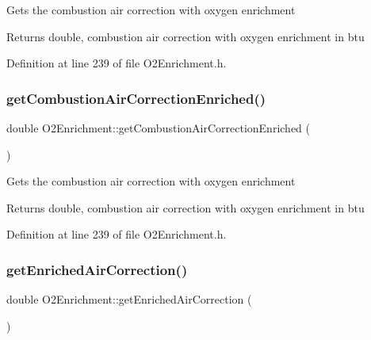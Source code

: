 Gets the combustion air correction with oxygen enrichment \begin{DoxyReturn}{Returns}
double, combustion air correction with oxygen enrichment in btu 
\end{DoxyReturn}


Definition at line 239 of file O2\+Enrichment.\+h.

\mbox{\label{class_o2_enrichment_aa8bbec67d760c83da77ce5b4ee01e41c}} 
\subsubsection{\texorpdfstring{get\+Combustion\+Air\+Correction\+Enriched()}{getCombustionAirCorrectionEnriched()}\hspace{0.1cm}{\footnotesize\ttfamily [3/3]}}
{\footnotesize\ttfamily double O2\+Enrichment\+::get\+Combustion\+Air\+Correction\+Enriched (\begin{DoxyParamCaption}{ }\end{DoxyParamCaption})\hspace{0.3cm}{\ttfamily [inline]}}

Gets the combustion air correction with oxygen enrichment \begin{DoxyReturn}{Returns}
double, combustion air correction with oxygen enrichment in btu 
\end{DoxyReturn}


Definition at line 239 of file O2\+Enrichment.\+h.

\mbox{\label{class_o2_enrichment_a7e1eeaca64c46969c0652a46b67fad76}} 
\subsubsection{\texorpdfstring{get\+Enriched\+Air\+Correction()}{getEnrichedAirCorrection()}\hspace{0.1cm}{\footnotesize\ttfamily [1/3]}}
{\footnotesize\ttfamily double O2\+Enrichment\+::get\+Enriched\+Air\+Correction (\begin{DoxyParamCaption}{ }\end{DoxyParamCaption})\hspace{0.3cm}{\ttfamily [inline]}}

